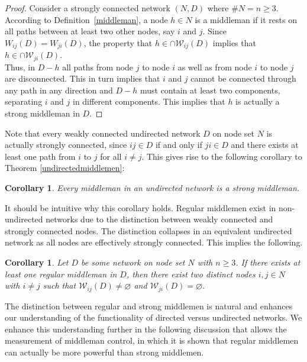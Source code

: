 \documentclass[11pt,fleqn]{article}
\newtheorem{corollary}[theorem]{Corollary}
\begin{document}
\begin{proof}
Consider a strongly connected network $(N,D)$ where $\# N =n \geqslant 3$. According to Definition~\ref{middleman}, a node $h \in N$ is a middleman if it rests on all paths between at least two other nodes, say $i$ and $j$. Since $W_{ij}(D) = W_{ji}(D)$, the property that $h \in \cap \mathcal{W}_{ij}(D)$ implies that $h \in \cap \mathcal{W}_{ji}(D)$.
\\
Thus, in $D - h$ all paths from node $j$ to node $i$ as well as from node $i$ to node $j$ are disconnected. This in turn implies that $i$ and $j$ cannot be connected through any path in any direction and $D - h$ must contain at least two components, separating $i$ and $j$ in different components. This implies that $h$ is actually a strong middleman in $D$.
\end{proof}

\medskip\noindent
Note that every weakly connected undirected network $D$ on node set $N$ is actually strongly connected, since $ij \in D$ if and only if $ji \in D$ and there exists at least one path from $i$ to $j$ for all $i \neq j$. This gives rise to the following corollary to Theorem \ref{undirectedmiddlemen}:

\begin{corollary}
	Every middleman in an undirected network is a strong middleman.
\end{corollary}

\medskip \noindent It should be intuitive why this corollary holds. Regular middlemen exist in non-undirected networks due to the distinction between weakly connected and strongly connected nodes. The distinction collapses in an equivalent undirected network as all nodes are effectively strongly connected. This implies the following.

\begin{corollary} \label{corundirectedmiddleman}
Let $D$ be some network on node set $N$ with $n \geqslant 3$. If there exists at least one regular middleman in $D$, then there exist two distinct nodes $i,j \in N$ with $i \neq j$ such that $\mathcal W_{ij} (D) \neq \varnothing$ and $\mathcal W_{ji} (D) = \varnothing$.
\end{corollary}

\noindent
The distinction between regular and strong middlemen is natural and enhances our understanding of the functionality of directed versus undirected networks. We enhance this understanding further in the following discussion that allows the measurement of middleman control, in which it is shown that regular middlemen can actually be more powerful than strong middlemen.
\end{document}
